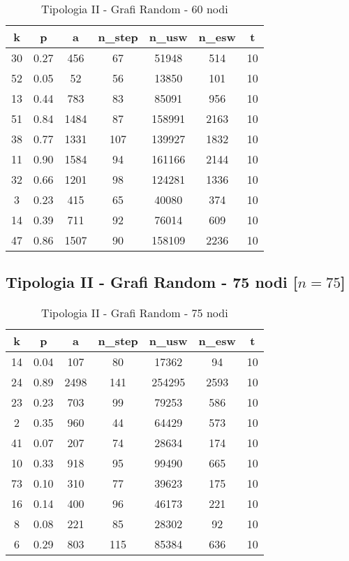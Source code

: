 \begin{table}[H]
\centering
\begin{tabular}{|c|c|c|c|c|c|c|}
\hline
\textbf{k} & \textbf{p} & \textbf{a} & \textbf{n\_step} & \textbf{n\_usw} & \textbf{n\_esw} & \textbf{t} \\ \hline
30 & 0.27 & 456 & 67 & 51948 & 514 & 10 \\ \hline
52 & 0.05 & 52 & 56 & 13850 & 101 & 10 \\ \hline
13 & 0.44 & 783 & 83 & 85091 & 956 & 10 \\ \hline
51 & 0.84 & 1484 & 87 & 158991 & 2163 & 10 \\ \hline
38 & 0.77 & 1331 & 107 & 139927 & 1832 & 10 \\ \hline
11 & 0.90 & 1584 & 94 & 161166 & 2144 & 10 \\ \hline
32 & 0.66 & 1201 & 98 & 124281 & 1336 & 10 \\ \hline
3 & 0.23 & 415 & 65 & 40080 & 374 & 10 \\ \hline
14 & 0.39 & 711 & 92 & 76014 & 609 & 10 \\ \hline
47 & 0.86 & 1507 & 90 & 158109 & 2236 & 10 \\ \hline
\end{tabular}
\caption{Tipologia II - Grafi Random - 60 nodi}
\label{tab:sperimentazione-tipo1-60nodi}
\end{table}

\subsection{Tipologia II - Grafi Random - 75 nodi [$n=75$]}

\begin{table}[H]
\centering
\begin{tabular}{|c|c|c|c|c|c|c|}
\hline
\textbf{k} & \textbf{p} & \textbf{a} & \textbf{n\_step} & \textbf{n\_usw} & \textbf{n\_esw} & \textbf{t} \\ \hline
14 & 0.04 & 107 & 80 & 17362 & 94 & 10 \\ \hline
24 & 0.89 & 2498 & 141 & 254295 & 2593 & 10 \\ \hline
23 & 0.23 & 703 & 99 & 79253 & 586 & 10 \\ \hline
2 & 0.35 & 960 & 44 & 64429 & 573 & 10 \\ \hline
41 & 0.07 & 207 & 74 & 28634 & 174 & 10 \\ \hline
10 & 0.33 & 918 & 95 & 99490 & 665 & 10 \\ \hline
73 & 0.10 & 310 & 77 & 39623 & 175 & 10 \\ \hline
16 & 0.14 & 400 & 96 & 46173 & 221 & 10 \\ \hline
8 & 0.08 & 221 & 85 & 28302 & 92 & 10 \\ \hline
6 & 0.29 & 803 & 115 & 85384 & 636 & 10 \\ \hline
\end{tabular}
\caption{Tipologia II - Grafi Random - 75 nodi}
\label{tab:sperimentazione-tipo1-75nodi}
\end{table}

